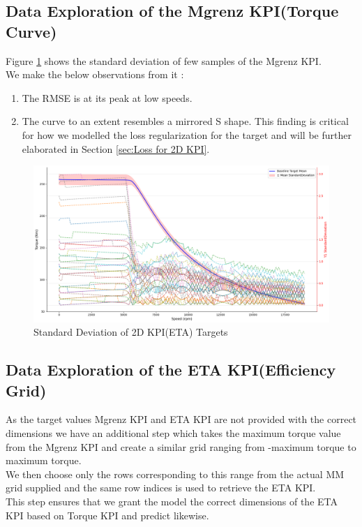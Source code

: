 \documentclass{report} %
\begin{document}
\subsection{Data Exploration of the Mgrenz \ac{KPI}(Torque Curve)}\label{sec:Deep Dive into 2D KPI}

Figure \ref{fig:Standard Deviation of 2D KPI(ETA) Targets} shows the standard deviation of few samples of the Mgrenz \ac{KPI}.\\

We make the below  observations from it :
\begin{enumerate}
    \item The \ac{RMSE} is at its peak at low speeds.
    \item The curve to an extent resembles a mirrored S shape.
    This finding is critical for how we modelled the loss regularization for the target and will be further elaborated in Section \ref{sec:Loss for 2D KPI}.
\end{enumerate}

\begin{figure}[H]
    \centering
    \includegraphics[width=1\textwidth]{./ReportImages/StandardDeviation_Baseline_y1.png} 
    \caption{Standard Deviation of 2D KPI(ETA) Targets} 
    \label{fig:Standard Deviation of 2D KPI(ETA) Targets}
\end{figure}


\subsection{Data Exploration of the ETA \ac{KPI}(Efficiency Grid)}\label{sec:Deep Dive into 3D KPI}

As the target values Mgrenz \ac{KPI} and ETA \ac{KPI} are not provided with the correct dimensions we have an additional step which takes the maximum torque value from the Mgrenz \ac{KPI} and create a similar grid ranging from -maximum torque to maximum torque. \\
We then choose only the rows corresponding to this range from the actual MM grid supplied and the same row indices is used to retrieve the ETA \ac{KPI}. \\
This step ensures that we grant the model the correct dimensions of the ETA \ac{KPI} based on Torque \ac{KPI} and predict likewise.\\
\end{document}
